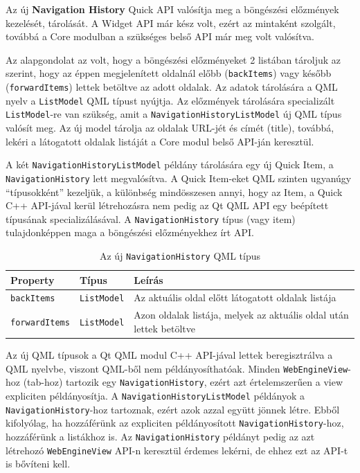 \documentclass[12pt]{report}
\begin{document}
\noindent
Az új \textbf{Navigation History} Quick API valósítja meg a böngészési előzmények kezelését,
tárolását. A Widget API már kész volt, ezért az mintaként szolgált, továbbá a Core modulban
a szükséges belső API már meg volt valósítva.

Az alapgondolat az volt, hogy a böngészési előzményeket 2 listában tároljuk az szerint,
hogy az éppen megjelenített oldalnál előbb (\texttt{backItems}) vagy
később (\texttt{forwardItems}) lettek betöltve az adott oldalak. Az adatok tárolására
a QML nyelv a \texttt{ListModel} QML típust nyújtja. Az előzmények tárolására specializált
\texttt{ListModel}-re van szükség, amit a \texttt{NavigationHistoryListModel} új QML típus
valósít meg. Az új model tárolja az oldalak URL-jét és címét (title), továbbá, lekéri
a látogatott oldalak listáját a Core modul belső API-ján keresztül.

A két \texttt{NavigationHistoryListModel} példány tárolására
egy új Quick Item, a \texttt{NavigationHistory} lett megvalósítva. A Quick Item-eket QML
szinten ugyanúgy ``típusokként'' kezeljük, a különbség mindösszesen annyi, hogy az Item,
a Quick C++ API-jával kerül létrehozásra nem pedig az Qt QML API egy beépített típusának
specializálásával. A \texttt{NavigationHistory} típus (vagy item) tulajdonképpen maga a
böngészési előzményekhez írt API.

\begin{table}[ht!]
    \centering
    \begin{tabular}{ | l | l | p{238pt} | }
        \hline
        \textbf{Property} & \textbf{Típus} & \textbf{Leírás} \\ \hline

        \texttt{backItems} & \texttt{ListModel} &
        Az aktuális oldal előtt látogatott oldalak listája
        \\ \hline

        \texttt{forwardItems} & \texttt{ListModel} &
        Azon oldalak listája, melyek az aktuális oldal után lettek betöltve
        \\ \hline
    \end{tabular}
    \caption{
        \label{tab:navigation-history-history-api}
        Az új \texttt{NavigationHistory} QML típus
    }
\end{table}

Az új QML típusok a Qt QML modul C++ API-jával lettek beregisztrálva a QML nyelvbe, viszont
QML-ből nem példányosíthatóak. Minden \texttt{WebEngineView}-hoz (tab-hoz) tartozik egy
\texttt{NavigationHistory}, ezért azt értelemszerűen a view expliciten példányosítja.
A \texttt{NavigationHistoryListModel} példányok a \texttt{NavigationHistory}-hoz tartoznak,
ezért azok azzal együtt jönnek létre. Ebből kifolyólag, ha hozzáférünk az expliciten
példányosított \texttt{NavigationHistory}-hoz, hozzáférünk a listákhoz is. Az
\texttt{NavigationHistory} példányt pedig az azt létrehozó \texttt{WebEngineView} API-n
keresztül érdemes lekérni, de ehhez ezt az API-t is bővíteni kell.
\end{document}
